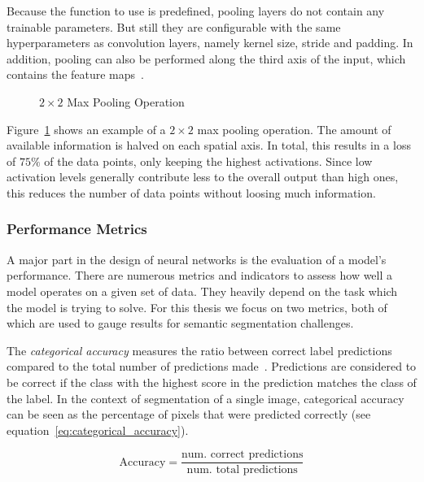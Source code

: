 Because the function to use is predefined, pooling layers do not contain any trainable parameters. But still they are configurable with the same hyperparameters as convolution layers, namely kernel size, stride and padding. In addition, pooling can also be performed along the third axis of the input, which contains the feature maps~\cite[p.~370]{praxiseinstieg_ml17}.

\begin{figure}[h]
    \centering
    
    \caption[$2\times 2$ Max Pooling Operation]{$2\times 2$ Max Pooling Operation~\cite[modified]{github-latex20}}
    \label{fig:pooling}
\end{figure}

Figure~\ref{fig:pooling} shows an example of a $2\times 2$ max pooling operation. The amount of available information is halved on each spatial axis. In total, this results in a loss of $75\%$ of the data points, only keeping the highest activations. Since low activation levels generally contribute less to the overall output than high ones, this reduces the number of data points without loosing much information.

\subsubsection{Performance Metrics}
\label{sec:metrics}
A major part in the design of neural networks is the evaluation of a model's performance. There are numerous metrics and indicators to assess how well a model operates on a given set of data. They heavily depend on the task which the model is trying to solve. For this thesis we focus on two metrics, both of which are used to gauge results for semantic segmentation challenges.

The \emph{categorical accuracy} measures the ratio between correct label predictions compared to the total number of predictions made~\cite{tf_whitepaper15}. Predictions are considered to be correct if the class with the highest score in the prediction matches the class of the label. In the context of segmentation of a single image, categorical accuracy can be seen as the percentage of pixels that were predicted correctly (see equation~\ref{eq:categorical_accuracy}).

\begin{equation}
    \label{eq:categorical_accuracy}
    \text{Accuracy} = \frac{\text{num. correct predictions}}{\text{num. total predictions}}
\end{equation}

